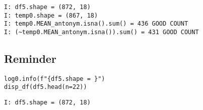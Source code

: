 \documentclass[a4paper,10pt,onecolumn,oneside,openright]{article}
\begin{document}
\begin{verbatim}
I: df5.shape = (872, 18)
I: temp0.shape = (867, 18)
I: temp0.MEAN_antonym.isna().sum() = 436 GOOD COUNT
I: (~temp0.MEAN_antonym.isna()).sum() = 431 GOOD COUNT
\end{verbatim}

\subsection{Reminder}
\label{sec:org7bb5a65}
\begin{verbatim}
log0.info(f"{df5.shape = }")
disp_df(df5.head(n=22))
\end{verbatim}

\begin{verbatim}
I: df5.shape = (872, 18)
\end{verbatim}
\end{document}
